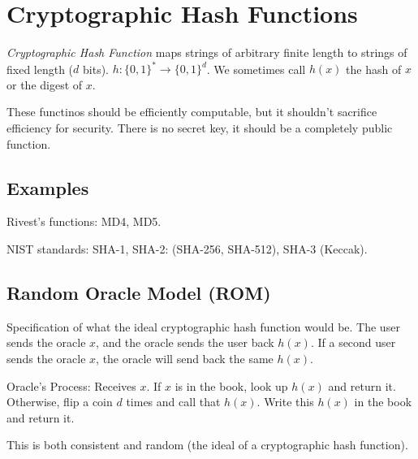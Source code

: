 \documentclass[psamsfonts]{amsart}
\begin{document}
\section{Cryptographic Hash Functions}

\emph{Cryptographic Hash Function} maps strings of arbitrary finite length to strings of fixed length ($d$ bits). $h: \{0, 1 \}^* \rightarrow \{0,1\}^d$. We sometimes call $h(x)$ the hash of $x$ or the digest of $x$.

These functinos should be efficiently computable, but it shouldn't sacrifice efficiency for security. There is no secret key, it should be a completely public function.

\subsection{Examples}

Rivest's functions: MD4, MD5. 

NIST standards: SHA-1, SHA-2: (SHA-256, SHA-512), SHA-3 (Keccak). 

\subsection{Random Oracle Model (ROM)}

Specification of what the ideal cryptographic hash function would be. The user sends the oracle $x$, and the oracle sends the user back $h(x)$. If a second user sends the oracle $x$, the oracle will send back the same $h(x)$. 

Oracle's Process: Receives $x$. If $x$ is in the book, look up $h(x)$ and return it. Otherwise, flip a coin $d$ times and call that $h(x)$. Write this $h(x)$ in the book and return it.

This is both consistent and random (the ideal of a cryptographic hash function).
\end{document}
